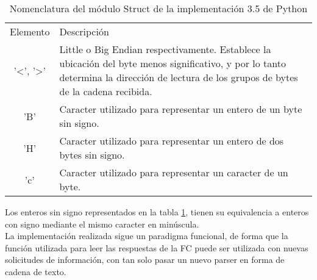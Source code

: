 \begin{table}[H]
	\begin{center}	
		\begin{tabular}{c | p{10cm}}\hline
			\toprule
			Elemento & Descripción\\
			\otoprule
			'<', '>' & Little o Big Endian respectivamente. Establece la ubicación del byte menos significativo, y por lo tanto determina la dirección de lectura de los grupos de bytes de la cadena recibida.\\
			'B' & Caracter utilizado para representar un entero de un byte sin signo.\\
			'H' & Caracter utilizado para representar un entero de dos bytes sin signo.\\
			'c' & Caracter utilizado para representar un caracter de un byte.\\
			\bottomrule
		\end{tabular}
		\caption{Nomenclatura del módulo Struct de la implementación 3.5 de Python}
		\label{tb:PY35STRUCT}
	\end{center}
\end{table} 

Los enteros sin signo representados en la tabla \ref{tb:PY35STRUCT}, tienen su equivalencia a enteros con signo mediante el mismo caracter en minúscula.\\La implementación realizada sigue un paradigma funcional, de forma que la función utilizada para leer las respuestas de la FC puede ser utilizada con nuevas solicitudes de información, con tan solo pasar un nuevo parser en forma de cadena de texto.



